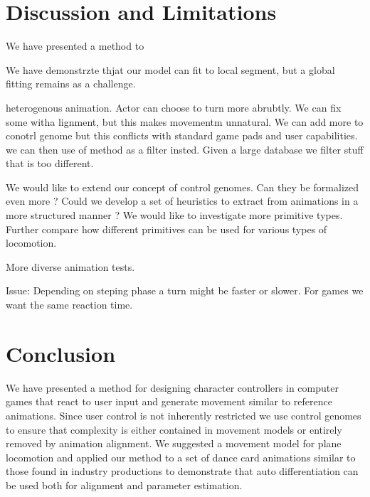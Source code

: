 \section{Discussion and Limitations}
We have presented a method to 

We have demonstrzte thjat our model can fit to local segment, but a global fitting remains as a challenge.

heterogenous animation. Actor can choose to turn more abrubtly. We can fix some witha lignment, but this makes movementm unnatural. We can add more to conotrl genome but this conflicts with standard game pads and user capabilities. we can then use of method as a filter insted. Given a large database we filter stuff that is too different.


We would like to extend our concept of control genomes. Can they be formalized even more ? Could we develop a set of heuristics to extract from animations in a more structured manner ? 
We would like to investigate more primitive types. Further compare how different primitives can be used for various types of locomotion.

More diverse animation tests.


Issue: Depending on steping phase a turn might be faster or slower. For games we want the same reaction time.

\section{Conclusion}
We have presented a method for designing character controllers in computer games that react to user input and generate movement similar to reference animations. Since user control is not inherently restricted we use control genomes to ensure that complexity is either contained in movement models or entirely removed by animation alignment. We suggested a movement model for plane locomotion and applied our method to a set of dance card animations similar to those found in industry productions to demonstrate that auto differentiation can be used both for alignment and parameter estimation.  



